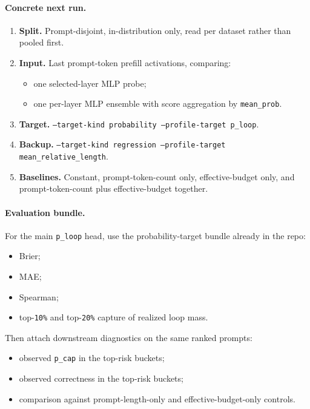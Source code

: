 \documentclass[11pt]{article}
\begin{document}
\paragraph{Concrete next run.}
\begin{enumerate}[leftmargin=1.5em]
\item \textbf{Split.} Prompt-disjoint, in-distribution only, read per dataset rather
  than pooled first.
\item \textbf{Input.} Last prompt-token prefill activations, comparing:
  \begin{itemize}[leftmargin=1.5em]
  \item one selected-layer MLP probe;
  \item one per-layer MLP ensemble with score aggregation by \texttt{mean\_prob}.
  \end{itemize}
\item \textbf{Target.} \texttt{--target-kind probability --profile-target p\_loop}.
\item \textbf{Backup.} \texttt{--target-kind regression --profile-target mean\_relative\_length}.
\item \textbf{Baselines.} Constant, prompt-token-count only, effective-budget only,
  and prompt-token-count plus effective-budget together.
\end{enumerate}

\paragraph{Evaluation bundle.}
For the main \texttt{p\_loop} head, use the probability-target bundle already in
the repo:
\begin{itemize}[leftmargin=1.5em]
\item Brier;
\item MAE;
\item Spearman;
\item top-\texttt{10\%} and top-\texttt{20\%} capture of realized loop mass.
\end{itemize}
Then attach downstream diagnostics on the same ranked prompts:
\begin{itemize}[leftmargin=1.5em]
\item observed \texttt{p\_cap} in the top-risk buckets;
\item observed correctness in the top-risk buckets;
\item comparison against prompt-length-only and effective-budget-only controls.
\end{itemize}
\end{document}
